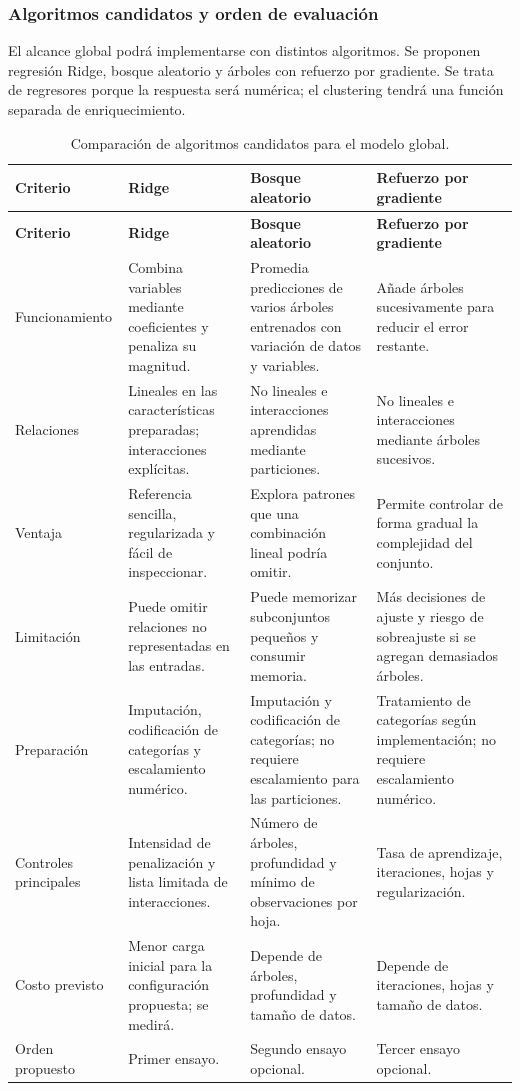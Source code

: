 \subsubsection*{Algoritmos candidatos y orden de evaluación}
El alcance global podrá implementarse con distintos algoritmos. Se proponen regresión Ridge, bosque aleatorio y árboles con refuerzo por gradiente. Se trata de regresores porque la respuesta será numérica; el clustering tendrá una función separada de enriquecimiento.

\begingroup
\small
\setlength{\tabcolsep}{3pt}
\renewcommand{\arraystretch}{1.15}
\begin{longtable}{@{}>{\raggedright\arraybackslash}p{2.3cm}>{\raggedright\arraybackslash}p{3.55cm}>{\raggedright\arraybackslash}p{3.55cm}>{\raggedright\arraybackslash}p{3.55cm}@{}}
\caption{Comparación de algoritmos candidatos para el modelo global.}
\label{tab:algoritmos-fase1-616}\\
\toprule
\textbf{Criterio} & \textbf{Ridge} & \textbf{Bosque aleatorio} & \textbf{Refuerzo por gradiente}\\
\midrule
\endfirsthead
\toprule
\textbf{Criterio} & \textbf{Ridge} & \textbf{Bosque aleatorio} & \textbf{Refuerzo por gradiente}\\
\midrule
\endhead
\bottomrule
\endfoot
Funciona\-miento & Combina variables mediante coeficientes y penaliza su magnitud. & Promedia predicciones de varios árboles entrenados con variación de datos y variables. & Añade árboles sucesivamente para reducir el error restante.\\
Relaciones & Lineales en las características preparadas; interacciones explícitas. & No lineales e interacciones aprendidas mediante particiones. & No lineales e interacciones mediante árboles sucesivos.\\
Ventaja & Referencia sencilla, regularizada y fácil de inspeccionar. & Explora patrones que una combinación lineal podría omitir. & Permite controlar de forma gradual la complejidad del conjunto.\\
Limitación & Puede omitir relaciones no representadas en las entradas. & Puede memorizar subconjuntos pequeños y consumir memoria. & Más decisiones de ajuste y riesgo de sobreajuste si se agregan demasiados árboles.\\
Preparación & Imputación, codificación de categorías y escalamiento numérico. & Imputación y codificación de categorías; no requiere escalamiento para las particiones. & Tratamiento de categorías según implementación; no requiere escalamiento numérico.\\
Controles principales & Intensidad de penalización y lista limitada de interacciones. & Número de árboles, profundidad y mínimo de observaciones por hoja. & Tasa de aprendizaje, iteraciones, hojas y regularización.\\
Costo previsto & Menor carga inicial para la configuración propuesta; se medirá. & Depende de árboles, profundidad y tamaño de datos. & Depende de iteraciones, hojas y tamaño de datos.\\
Orden propuesto & Primer ensayo. & Segundo ensayo opcional. & Tercer ensayo opcional.\\
\end{longtable}
\endgroup

